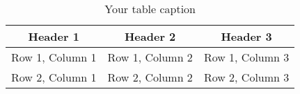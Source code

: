 \documentclass[12pt]{article}
\begin{document}
\begin{table}[htbp] %
    \centering
    \begin{tabular}{|c|c|c|} %
    \hline
    Header 1 & Header 2 & Header 3 \\ %
    \hline
    Row 1, Column 1 & Row 1, Column 2 & Row 1, Column 3 \\ %
    \hline
    Row 2, Column 1 & Row 2, Column 2 & Row 2, Column 3 \\ %
    \hline
    \end{tabular}
    \caption{Your table caption} %
    \label{tab:your_label} %
\end{table}
\end{document}
